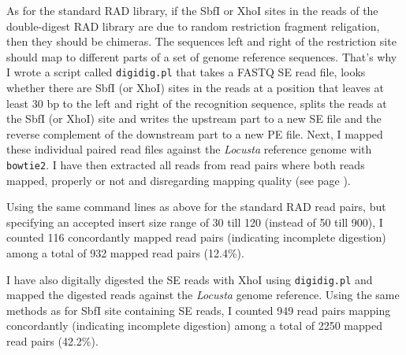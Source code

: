 \documentclass[a4paper,12pt,times,authoryear,twoside,print,index]{Classes/PhDThesisPSnPDF}\usepackage[]{graphicx}\usepackage[]{color}
\begin{document}
As for the standard RAD library, if the SbfI or XhoI sites in the reads of the double-digest RAD library are due to random restriction fragment religation, then they should be chimeras. The sequences left and right of the restriction site should map to different parts of a set of genome reference sequences.
That's why I wrote a script called \texttt{digidig.pl} that takes a FASTQ SE read file, looks whether there are SbfI (or XhoI) sites in the reads at a position that leaves at least 30 bp to the left and right of the recognition sequence, splits the reads at the SbfI (or XhoI) site and writes the upstream part to a new SE file and the reverse complement of the downstream part to a new PE file. Next, I mapped these individual paired read files against the \textit{Locusta} reference genome \citep{Wang2014} with \texttt{bowtie2}. I have then extracted all reads from read pairs where both reads mapped, properly or not and disregarding mapping quality (see page \pageref{read_pair_mapping_analysis}).

Using the same command lines as above for the standard RAD read pairs, but specifying an accepted insert size range of 30 till 120 (instead of 50 till 900), I counted 116 \gls{concordant}ly mapped read pairs (indicating incomplete digestion) among a total of 932 mapped read pairs (12.4\%).

I have also digitally digested the SE reads with XhoI using \texttt{digidig.pl} and mapped the digested reads against the \textit{Locusta} genome reference. Using the same methods as for SbfI site containing SE reads, I counted 949 read pairs mapping concordantly (indicating incomplete digestion) among a total of 2250 mapped read pairs (42.2\%).

%
%
\end{document}
